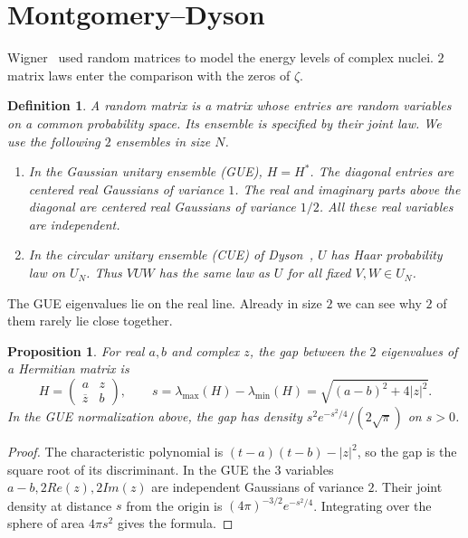 \documentclass[11pt,a4paper]{article}
\newtheorem{prop}[thm]{Proposition}
\newtheorem{defn}[thm]{Definition}
\begin{document}
\section{Montgomery--Dyson}\label{mont}
Wigner~\cite{wigner} used random matrices to model the energy levels of complex nuclei. $2$ matrix laws enter the comparison with the zeros of $\zeta$.

\begin{samepage}
\begin{defn}
A random matrix is a matrix whose entries are random variables on a common probability space. Its ensemble is specified by their joint law. We use the following $2$ ensembles in size $N$.
\renewcommand{\labelenumi}{\textup{\theenumi.}}
\begin{enumerate}
\item In the Gaussian unitary ensemble (GUE), $H=H^*$. The diagonal entries are centered real Gaussians of variance $1$. The real and imaginary parts above the diagonal are centered real Gaussians of variance $1/2$. All these real variables are independent.
\item In the circular unitary ensemble (CUE) of Dyson~\textup{\cite{dyson}}, $U$ has Haar probability law on $U_N$. Thus $VUW$ has the same law as $U$ for all fixed $V,W\in U_N$.
\end{enumerate}
\end{defn}
\end{samepage}

The GUE eigenvalues lie on the real line. Already in size $2$ we can see why $2$ of them rarely lie close together.

\begin{samepage}
\begin{prop}\label{matrix-gap}
For real $a,b$ and complex $z$, the gap between the $2$ eigenvalues of a Hermitian matrix is
\[
 H=\begin{pmatrix}a&z\\ \overline z&b\end{pmatrix},\qquad
 s=\lambda_{\max}(H)-\lambda_{\min}(H)=\sqrt{(a-b)^2+4|z|^2}.
\]
In the GUE normalization above, the gap has density $s^2e^{-s^2/4}/(2\sqrt\pi)$ on $s>0$.
\end{prop}
\end{samepage}
\begin{proof}
The characteristic polynomial is $(t-a)(t-b)-|z|^2$, so the gap is the square root of its discriminant. In the GUE the $3$ variables $a-b,2Re(z),2Im(z)$ are independent Gaussians of variance $2$. Their joint density at distance $s$ from the origin is $(4\pi)^{-3/2}e^{-s^2/4}$. Integrating over the sphere of area $4\pi s^2$ gives the formula.
\end{proof}
\end{document}
